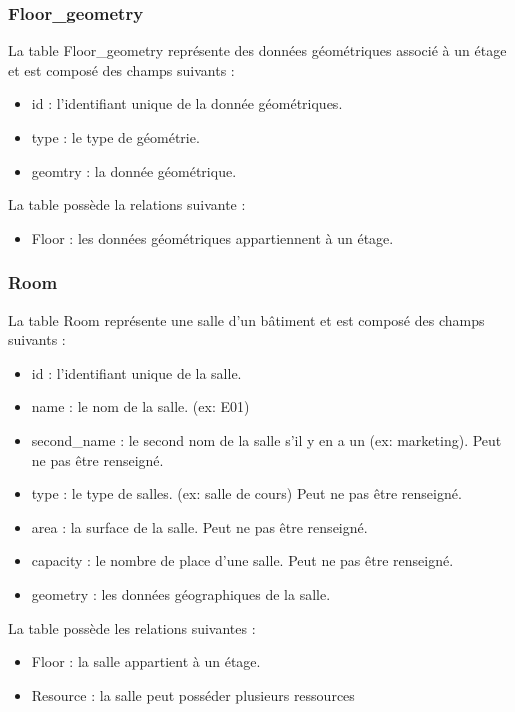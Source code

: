 \documentclass[
    iai, %
    il, %
]{heig-tb}
\begin{document}
\subsubsection{Floor\_geometry}
La table Floor\_geometry représente des données géométriques associé à un étage et est composé des champs suivants :

\begin{itemize}
    \item id : l'identifiant unique de la donnée géométriques.
    \item type : le type de géométrie.
    \item geomtry : la donnée géométrique.
\end{itemize}

La table possède la relations suivante :
\begin{itemize}
    \item Floor : les données géométriques appartiennent à un étage.
\end{itemize}

\subsubsection{Room}
La table Room représente une salle d'un bâtiment et est composé des champs suivants :

\begin{itemize}
    \item id : l'identifiant unique de la salle.
    \item name : le nom de la salle. (ex: E01)
    \item second\_name : le second nom de la salle s'il y en a un (ex: marketing). Peut ne pas être renseigné.
    \item type : le type de salles. (ex: salle de cours) Peut ne pas être renseigné.
    \item area : la surface de la salle. Peut ne pas être renseigné.
    \item capacity : le nombre de place d'une salle. Peut ne pas être renseigné.
    \item geometry : les données géographiques de la salle.
\end{itemize}

La table possède les relations suivantes :
\begin{itemize}
    \item Floor : la salle appartient à un étage.
    \item Resource : la salle peut posséder plusieurs ressources
\end{itemize}
\end{document}
